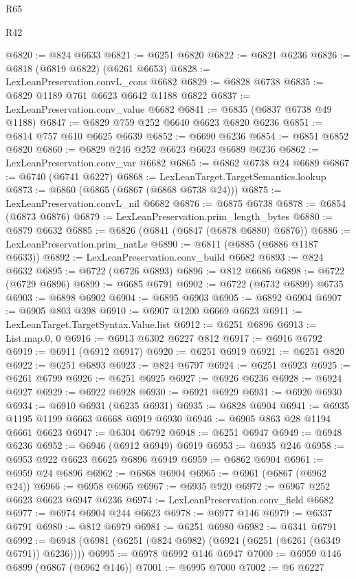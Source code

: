 \begin{lexlean}{R65}
\begin{lexlean}{R42}
\begin{coremodule}
{{{{{{{{{{{{{{{{{{{{{{{{{{{{{{{{{{{{{{{{{{{{{{{{{{{{{{{{{{{{{{{{{{{{{{{{{{{{{{{{{{{{{{{{{{{{{{{{{{{{{{{{{{{{{{{{{{{{{{{{{{{{{{{{{{{{{{{{{{{{{{{{{{{{{{{{{{{{{{{{{{{{{{{{{{{{{{{{{{{{{{{{@6820 := @824 @6633
@6821 := @6251 @6820
@6822 := @6821 @6236
@6826 := @6818 (@6819 @6822) (@6261 @6653)
@6828 := LexLeanPreservation.convL_cons @6682
@6829 := @6828 @6738
@6835 := @6829 @1189 @761 @6623 @6642 @1188 @6822
@6837 := LexLeanPreservation.conv_value @6682
@6841 := @6835 (@6837 @6738 @49 @1188)
@6847 := @6829 @759 @252 @6640 @6623 @6820 @6236
@6851 := @6814 @757 @610 @6625 @6639
@6852 := @6690 @6236
@6854 := @6851 @6852 @6820
@6860 := @6829 @246 @252 @6623 @6623 @6689 @6236
@6862 := LexLeanPreservation.conv_var @6682
@6865 := @6862 @6738 @24 @6689
@6867 := @6740 (@6741 @6227)
@6868 := LexLeanTarget.TargetSemantics.lookup
@6873 := @6860 (@6865 (@6867 (@6868 @6738 @24)))
@6875 := LexLeanPreservation.convL_nil @6682
@6876 := @6875 @6738
@6878 := @6854 (@6873 @6876)
@6879 := LexLeanPreservation.prim_length_bytes
@6880 := @6879 @6632
@6885 := @6826 (@6841 (@6847 (@6878 @6880) @6876))
@6886 := LexLeanPreservation.prim_natLe
@6890 := @6811 (@6885 (@6886 @1187 @6633))
@6892 := LexLeanPreservation.conv_build @6682
@6893 := @824 @6632
@6895 := @6722 (@6726 @6893)
@6896 := @812 @6686
@6898 := @6722 (@6729 @6896)
@6899 := @6685 @6791
@6902 := @6722 (@6732 @6899) @6735
@6903 := @6898 @6902
@6904 := @6895 @6903
@6905 := @6892 @6904
@6907 := @6905 @803 @398
@6910 := @6907 @1200 @6669 @6623
@6911 := LexLeanTarget.TargetSyntax.Value.list
@6912 := @6251 @6896
@6913 := List.map.{0, 0}
@6916 := @6913 @6302 @6227 @812
@6917 := @6916 @6792
@6919 := @6911 (@6912 @6917)
@6920 := @6251 @6919
@6921 := @6251 @820
@6922 := @6251 @6893
@6923 := @824 @6797
@6924 := @6251 @6923
@6925 := @6261 @6799
@6926 := @6251 @6925
@6927 := @6926 @6236
@6928 := @6924 @6927
@6929 := @6922 @6928
@6930 := @6921 @6929
@6931 := @6920 @6930
@6934 := @6910 @6931 (@6235 @6931)
@6935 := @6828 @6904
@6941 := @6935 @1195 @1199 @6663 @6668 @6919 @6930
@6946 := @6905 @863 @28 @1194 @6661 @6623
@6947 := @6304 @6792
@6948 := @6251 @6947
@6949 := @6948 @6236
@6952 := @6946 (@6912 @6949) @6919
@6953 := @6935 @246
@6958 := @6953 @922 @6623 @6625 @6896 @6949
@6959 := @6862 @6904
@6961 := @6959 @24 @6896
@6962 := @6868 @6904
@6965 := @6961 (@6867 (@6962 @24))
@6966 := @6958 @6965
@6967 := @6935 @920
@6972 := @6967 @252 @6623 @6623 @6947 @6236
@6974 := LexLeanPreservation.conv_field @6682
@6977 := @6974 @6904 @244 @6623
@6978 := @6977 @146
@6979 := @6337 @6791
@6980 := @812 @6979
@6981 := @6251 @6980
@6982 := @6341 @6791
@6992 := @6948 (@6981 (@6251 (@824 @6982) (@6924 (@6251 (@6261 (@6349 @6791)) @6236))))
@6995 := @6978 @6992 @146 @6947
@7000 := @6959 @146 @6899 (@6867 (@6962 @146))
@7001 := @6995 @7000
@7002 := @6 @6227
}}}}}}}}}}}}}}}}}}}}}}}}}}}}}}}}}}}}}}}}}}}}}}}}}}}}}}}}}}}}}}}}}}}}}}}}}}}}}}}}}}}}}}}}}}}}}}}}}}}}}}}}}}}}}}}}}}}}}}}}}}}}}}}}}}}}}}}}}}}}}}}}}}}}}}}}}}}}}}}}}}}}}}}}}}}}}}}}}}}}}}}}
\end{coremodule}
\end{lexlean}
\end{lexlean}
